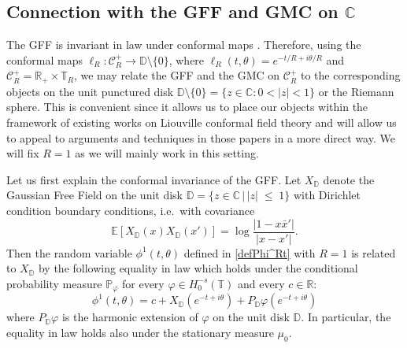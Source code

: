 \documentclass[11pt]{amsart}
\numberwithin{equation}{section}
\theoremstyle{definition}
\renewcommand{\leq}{\;\leqslant\;}                   %
\newcommand{\C}{\mathbb{C}}
\newcommand{\D}{\mathbb{D}}
\newcommand{\R}{\mathbb{R}}
\def\E{\mathbb{E}}
\begin{document}
\subsection{Connection with the GFF and GMC on $\mathbb{C}$}

The GFF is invariant in law under conformal maps \cite[Theorem 1.57]{Berestycki_lqggff}. Therefore, using the conformal maps $\ell_R:\mathcal{C}_{R}^+ \rightarrow \mathbb{D}\setminus\{0\}$, where $\ell_R(t,\theta) = e^{-t/R+i\theta/R}$ and $\mathcal{C}_{R}^+ = \R_+\times\mathbb{T}_R$, we may relate the GFF and the GMC on $\mathcal{C}_{R}^+$ to the corresponding objects on the unit punctured disk $\mathbb{D}\setminus \{0\} = \{ z \in \mathbb C : 0 < |z| < 1\}$ or the Riemann sphere. This is convenient since it allows us to place our objects within the framework of existing works on Liouville conformal field theory \cite{DKRV16, GKRV21_Segal, GKRV} and will allow us to appeal to arguments and techniques in those papers in a more direct way. We will fix $R=1$ as we will mainly work in this setting. 


Let us first explain the conformal invariance of the GFF. Let  $X_{\D}$ denote the Gaussian Free Field on the unit disk $\D=\{z\in \C\,|\, |z|\leq 1 \}$ with Dirichlet condition boundary conditions, i.e.\ with covariance 
\[ \E[ X_{\D}(x)X_{\D}(x')]=\log\frac{|1-x\bar{x}'|}{|x-x'|}.\]
Then the random variable $\phi^1(t,\theta)$ defined in \eqref{defPhi^Rt} with $R=1$ is related to $X_{\D}$ by the following equality in law which holds under the conditional probability measure $\mathbb{P}_\varphi$ for every $\varphi \in H^{-s}_0(\mathbb{T})$ and every $c \in \mathbb{R}$:
\begin{equation}\label{linkGFFdisk}
\phi^1(t,\theta)=c+X_\D(e^{-t+i\theta})+P_\D\varphi(e^{-t+i\theta})
\end{equation}
where $P_\D \varphi$ is the harmonic extension of $\varphi$ on the unit disk $\D$.
In particular, the equality in law holds also under the stationary measure $\mu_0$.
\end{document}

